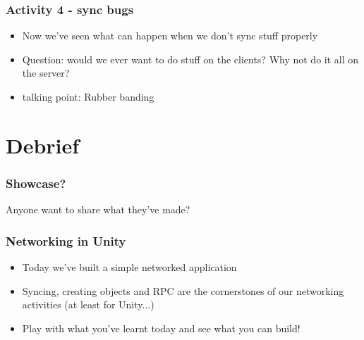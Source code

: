 \begin{frame}
	\frametitle{Activity 4 - sync bugs}
	
	\begin{itemize}
		\item Now we've seen what can happen when we don't sync stuff properly
		\item Question: would we ever want to do stuff on the clients? Why not do it all on the server?
		\item talking point: Rubber banding
	\end{itemize}
	
\end{frame}

\section{Debrief}

\begin{frame}
	\frametitle{Showcase?}
	
	\begin{center}
		Anyone want to share what they've made?
	\end{center}
\end{frame}

\begin{frame}
	\frametitle{Networking in Unity}
	
	\begin{itemize}
		\item Today we've built a simple networked application
		\item Syncing, creating objects and RPC are the cornerstones of our networking activities (at least for Unity...)
		\item Play with what you've learnt today and see what you can build!
	\end{itemize}
	
\end{frame}


